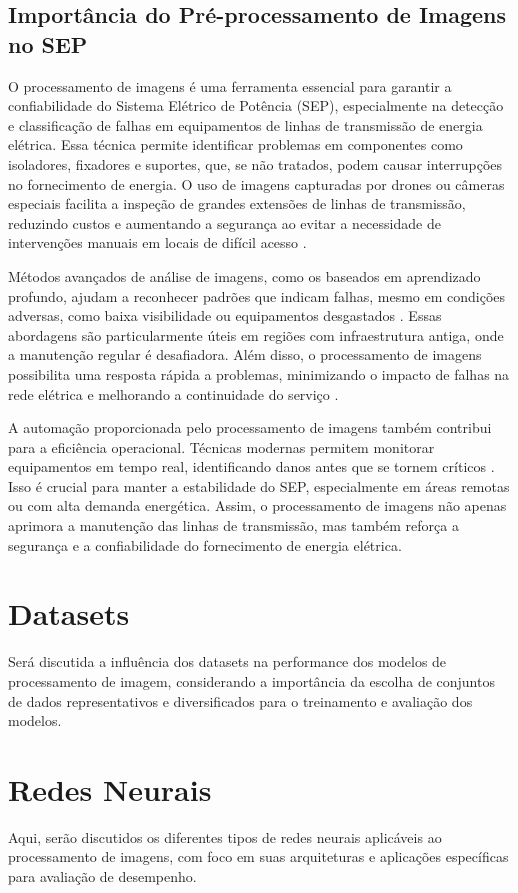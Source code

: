 \subsection{Importância do Pré-processamento de Imagens no SEP}

O processamento de imagens é uma ferramenta essencial para garantir a confiabilidade do Sistema Elétrico de Potência (SEP), especialmente na detecção e classificação de falhas em equipamentos de linhas de transmissão de energia elétrica. Essa técnica permite identificar problemas em componentes como isoladores, fixadores e suportes, que, se não tratados, podem causar interrupções no fornecimento de energia. O uso de imagens capturadas por drones ou câmeras especiais facilita a inspeção de grandes extensões de linhas de transmissão, reduzindo custos e aumentando a segurança ao evitar a necessidade de intervenções manuais em locais de difícil acesso \cite{eze2022deep}.

Métodos avançados de análise de imagens, como os baseados em aprendizado profundo, ajudam a reconhecer padrões que indicam falhas, mesmo em condições adversas, como baixa visibilidade ou equipamentos desgastados \cite{Altaie2023}. Essas abordagens são particularmente úteis em regiões com infraestrutura antiga, onde a manutenção regular é desafiadora. Além disso, o processamento de imagens possibilita uma resposta rápida a problemas, minimizando o impacto de falhas na rede elétrica e melhorando a continuidade do serviço \cite{kumar2023novel}.

A automação proporcionada pelo processamento de imagens também contribui para a eficiência operacional. Técnicas modernas permitem monitorar equipamentos em tempo real, identificando danos antes que se tornem críticos \cite{eze2022deep}. Isso é crucial para manter a estabilidade do SEP, especialmente em áreas remotas ou com alta demanda energética. Assim, o processamento de imagens não apenas aprimora a manutenção das linhas de transmissão, mas também reforça a segurança e a confiabilidade do fornecimento de energia elétrica.

\section{Datasets}
Será discutida a influência dos datasets na performance dos modelos de processamento de imagem, considerando a importância da escolha de conjuntos de dados representativos e diversificados para o treinamento e avaliação dos modelos.

\section{Redes Neurais}
Aqui, serão discutidos os diferentes tipos de redes neurais aplicáveis ao processamento de imagens, com foco em suas arquiteturas e aplicações específicas para avaliação de desempenho.


